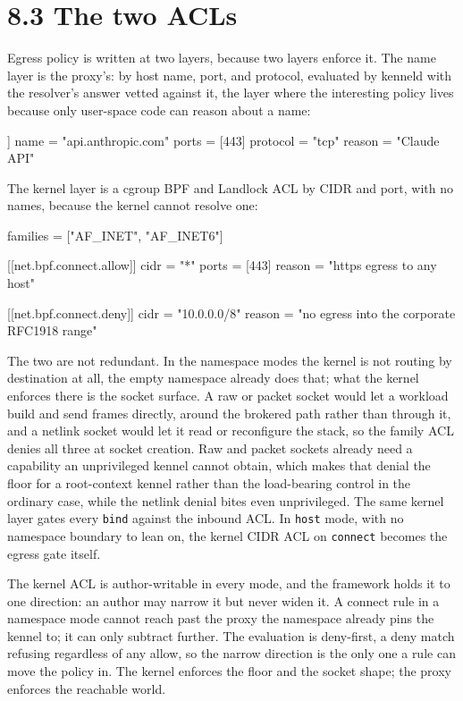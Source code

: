 \hypertarget{the-two-acls}{%
\section{8.3 The two ACLs}\label{the-two-acls}}

Egress policy is written at two layers, because two layers enforce it.
The name layer is the proxy's: by host name, port, and protocol,
evaluated by kenneld with the resolver's answer vetted against it, the
layer where the interesting policy lives because only user-space code
can reason about a name:

\begin{kennelcode}
[[net.proxy.allow]]
name     = "api.anthropic.com"
ports    = [443]
protocol = "tcp"
reason   = "Claude API"
\end{kennelcode}

The kernel layer is a cgroup BPF and Landlock ACL by CIDR and port, with
no names, because the kernel cannot resolve one:

\begin{kennelcode}
families = ["AF_INET", "AF_INET6"]

[[net.bpf.connect.allow]]
cidr   = "*"
ports  = [443]
reason = "https egress to any host"

[[net.bpf.connect.deny]]
cidr   = "10.0.0.0/8"
reason = "no egress into the corporate RFC1918 range"
\end{kennelcode}

The two are not redundant. In the namespace modes the kernel is not
routing by destination at all, the empty namespace already does that;
what the kernel enforces there is the socket surface. A raw or packet
socket would let a workload build and send frames directly, around the
brokered path rather than through it, and a netlink socket would let it
read or reconfigure the stack, so the family ACL denies all three at
socket creation. Raw and packet sockets already need a capability an
unprivileged kennel cannot obtain, which makes that denial the floor for
a root-context kennel rather than the load-bearing control in the
ordinary case, while the netlink denial bites even unprivileged. The
same kernel layer gates every \texttt{bind} against the inbound ACL. In
\texttt{host} mode, with no namespace boundary to lean on, the kernel
CIDR ACL on \texttt{connect} becomes the egress gate itself.

The kernel ACL is author-writable in every mode, and the framework holds
it to one direction: an author may narrow it but never widen it. A
connect rule in a namespace mode cannot reach past the proxy the
namespace already pins the kennel to; it can only subtract further. The
evaluation is deny-first, a deny match refusing regardless of any allow,
so the narrow direction is the only one a rule can move the policy in.
The kernel enforces the floor and the socket shape; the proxy enforces
the reachable world.

